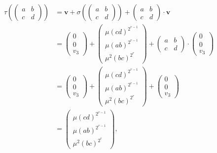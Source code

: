 \begin{align*}
\tau\left(\left(\begin{matrix} a & b \\ c & d \end{matrix}\right)\right) &=
\mathbf{v} + \sigma\left(\left(\begin{matrix} a & b \\ c & d \end{matrix}\right)\right) + 
\left(\begin{matrix} a & b \\ c & d \end{matrix}\right) \cdot \mathbf{v} \\
 &=
\left(\begin{matrix} 0 \\ 0 \\ v_3 \end{matrix}\right) + 
\left(\begin{matrix}  \mu(cd)^{2^{r-1}}  \\ \mu\left(ab \right)^{2^{r-1}} \\ \mu^2\left( bc \right)^{2^r} \end{matrix}\right)+ 
\left(\begin{matrix} a & b \\ c & d \end{matrix}\right) \cdot 
\left(\begin{matrix} 0 \\ 0 \\ v_3 \end{matrix}\right) \\
 &=
\left(\begin{matrix} 0 \\ 0 \\ v_3 \end{matrix}\right) + 
\left(\begin{matrix}  \mu(cd)^{2^{r-1}}  \\ \mu\left(ab \right)^{2^{r-1}} \\ \mu^2\left( bc \right)^{2^r} \end{matrix}\right)+ 
\left(\begin{matrix} 0 \\ 0 \\ v_3 \end{matrix}\right) \\
&= \left(\begin{matrix}  \mu(cd)^{2^{r-1}}  \\ \mu\left(ab \right)^{2^{r-1}} \\ \mu^2\left( bc \right)^{2^r} \end{matrix}\right),
\end{align*}
